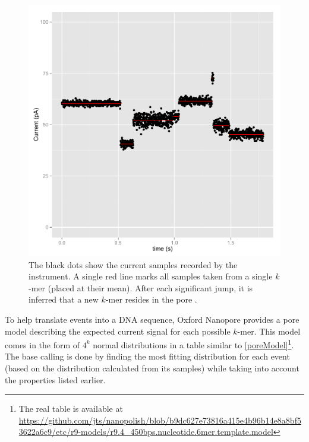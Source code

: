 \documentclass[times, utf, seminar]{fer}
\begin{document}
\begin{figure}[H]
	\begin{mdframed}[roundcorner=7pt]                                
	\centerline{\includegraphics[scale=0.8, clip]{simulation.pdf}}%
	\caption{The black dots show the current samples recorded by the instrument. A single red line marks all samples taken from a single $k$-mer (placed at their mean). After each significant jump, it is inferred that a new $k$-mer resides in the pore \citep{simpson}.}
	\label{sampling}
	\end{mdframed}                                                  
\end{figure}  

To help translate events into a DNA sequence, Oxford Nanopore provides a pore model describing the expected current signal for each possible $k$-mer. This model comes in the form of $4^k$ normal distributions in a table similar to \ref{poreModel}\footnote{The real table is available at \url{https://github.com/jts/nanopolish/blob/b9dc627e73816a415e4b96b14e8a8bf53622a6c9/etc/r9-models/r9.4_450bps.nucleotide.6mer.template.model}}. The base calling is done by finding the most fitting distribution for each event (based on the distribution calculated from its samples) while taking into account the properties listed earlier.
\end{document}
